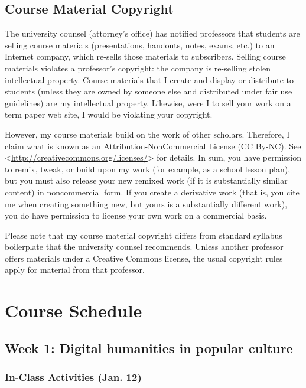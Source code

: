 \documentclass[]{article}
\begin{document}
\subsection{Course Material Copyright}\label{course-material-copyright}

The university counsel (attorney's office) has notified professors that
students are selling course materials (presentations, handouts, notes,
exams, etc.) to an Internet company, which re-sells those materials to
subscribers. Selling course materials violates a professor's copyright:
the company is re-selling stolen intellectual property. Course materials
that I create and display or distribute to students (unless they are
owned by someone else and distributed under fair use guidelines) are my
intellectual property. Likewise, were I to sell your work on a term
paper web site, I would be violating your copyright.

However, my course materials build on the work of other scholars.
Therefore, I claim what is known as an Attribution-NonCommercial License
(CC By-NC). See
\textless{}\url{http://creativecommons.org/licenses/}\textgreater{} for
details. In sum, you have permission to remix, tweak, or build upon my
work (for example, as a school lesson plan), but you must also release
your new remixed work (if it is substantially similar content) in
noncommercial form. If you create a derivative work (that is, you cite
me when creating something new, but yours is a substantially different
work), you do have permission to license your own work on a commercial
basis.

Please note that my course material copyright differs from standard
syllabus boilerplate that the university counsel recommends. Unless
another professor offers materials under a Creative Commons license, the
usual copyright rules apply for material from that professor.

\section{Course Schedule}\label{course-schedule}

\subsection{Week 1: Digital humanities in popular
culture}\label{week-1-digital-humanities-in-popular-culture}

\subsubsection{In-Class Activities (Jan.
12)}\label{in-class-activities-jan.-12}
\end{document}
